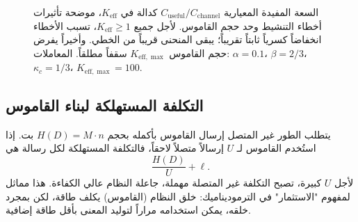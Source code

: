 \documentclass[12pt,a4paper]{article}
\newcommand{\Keff}{K_{\mathrm{eff}}}
\newcommand{\kappac}{\kappa_c}
\newcommand{\Keffmax}{K_{\mathrm{eff},\max}}
\theoremstyle{remark}
\begin{document}
	\begin{otherlanguage}{english}
		\begin{figure}[htbp]
			\centering
			\caption{السعة المفيدة المعيارية \(C_{\text{useful}}/C_{\text{channel}}\) كدالة في \(\Keff\)، موضحة تأثيرات أخطاء التنشيط وحد حجم القاموس. لأجل جميع \(K_{\mathrm{eff}} \ge 1\)، تسبب الأخطاء انخفاضاً كسرياً ثابتاً تقريباً؛ يبقى المنحنى قريباً من الخطي. وأخيراً يفرض حجم القاموس \(\Keffmax\) سقفاً مطلقاً. المعاملات: \(\alpha=0.1\)، \(\beta=2/3\)، \(\kappa_c=1/3\)، \(\Keffmax=100\).}
			\label{fig:useful-capacity}
		\end{figure}
	\end{otherlanguage}
	
	\subsection{التكلفة المستهلكة لبناء القاموس}
	
	يتطلب الطور غير المتصل إرسال القاموس بأكمله بحجم \(H(D) = M \cdot n\) بت. إذا استُخدم القاموس لـ \(U\) إرسالاً متصلاً لاحقاً، فالتكلفة المستهلكة لكل رسالة هي
	\[
	\frac{H(D)}{U} + \ell.
	\]
	لأجل \(U\) كبيرة، تصبح التكلفة غير المتصلة مهملة، جاعلة النظام عالي الكفاءة. هذا مماثل لمفهوم "الاستثمار" في الترموديناميك: خلق النظام (القاموس) يكلف طاقة، لكن بمجرد خلقه، يمكن استخدامه مراراً لتوليد المعنى بأقل طاقة إضافية.
	
\end{document}
